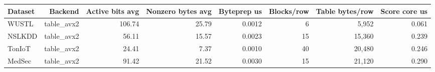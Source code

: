 \begin{tabular}{lrrrrrrr}
\toprule
Dataset & Backend & Active bits avg & Nonzero bytes avg & Byteprep us & Blocks/row & Table bytes/row & Score core us \\
\midrule
WUSTL & table\_avx2 & 106.74 & 25.79 & 0.0012 & 6 & 5,952 & 0.061 \\
NSLKDD & table\_avx2 & 56.11 & 15.57 & 0.0023 & 15 & 15,360 & 0.239 \\
TonIoT & table\_avx2 & 24.41 & 7.37 & 0.0010 & 40 & 20,480 & 0.246 \\
MedSec & table\_avx2 & 91.42 & 21.52 & 0.0030 & 15 & 21,120 & 0.290 \\
\bottomrule
\end{tabular}
